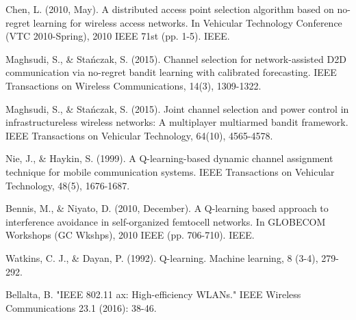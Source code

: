 \documentclass{article}
\begin{document}
	\begin{thebibliography}{20}
		
		 Chen, L. (2010, May). A distributed access point selection algorithm based on no-regret learning for wireless access networks. In Vehicular Technology Conference (VTC 2010-Spring), 2010 IEEE 71st (pp. 1-5). IEEE.
		
		 Maghsudi, S., \& Stańczak, S. (2015). Channel selection for network-assisted D2D communication via no-regret bandit learning with calibrated forecasting. IEEE Transactions on Wireless Communications, 14(3), 1309-1322.	
		
		 Maghsudi, S., \& Stańczak, S. (2015). Joint channel selection and power control in infrastructureless wireless networks: A multiplayer multiarmed bandit framework. IEEE Transactions on Vehicular Technology, 64(10), 4565-4578.
		
		 Nie, J., \& Haykin, S. (1999). A Q-learning-based dynamic channel assignment technique for mobile communication systems. IEEE Transactions on Vehicular Technology, 48(5), 1676-1687.
		
		 Bennis, M., \& Niyato, D. (2010, December). A Q-learning based approach to interference avoidance in self-organized femtocell networks. In GLOBECOM Workshops (GC Wkshps), 2010 IEEE (pp. 706-710). IEEE.

		 Watkins, C. J., \& Dayan, P. (1992). Q-learning. Machine learning, 8 (3-4), 279-292.
		
		 Bellalta, B. "IEEE 802.11 ax: High-efficiency WLANs." IEEE Wireless Communications 23.1 (2016): 38-46.  
		
	\end{thebibliography}	
	
\end{document}
